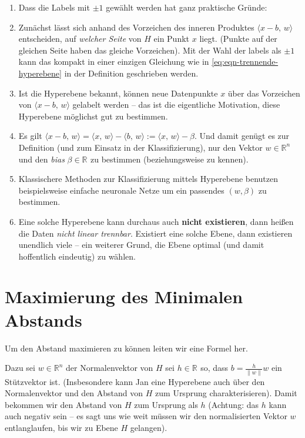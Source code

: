 \documentclass[
]{book}
\providecommand{\tightlist}{%
  \setlength{\itemsep}{0pt}\setlength{\parskip}{0pt}}
\theoremstyle{definition}
\theoremstyle{definition}
\theoremstyle{definition}
\theoremstyle{definition}
\theoremstyle{remark}
\begin{document}
\begin{enumerate}
\def\labelenumi{\arabic{enumi}.}
\tightlist
\item
  Dass die Labels mit \(\pm 1\) gewählt werden hat ganz praktische
  Gründe:
\item
  Zunächst lässt sich anhand des Vorzeichen des inneren Produktes
  \(\bigl \langle x-b, \, w\bigr\rangle \) entscheiden, auf \emph{welcher Seite} von \(H\) ein Punkt \(x\) liegt.
  (Punkte auf der gleichen Seite haben das gleiche Vorzeichen). Mit der Wahl
  der labels als \(\pm 1\) kann das kompakt in einer einzigen Gleichung wie
  in \eqref{eq:eqn-trennende-hyperebene}
  in der Definition geschrieben werden.
\item
  Ist die Hyperebene bekannt, können neue Datenpunkte \(x\) über das
  Vorzeichen von \(\bigl \langle x-b, \, w\bigr\rangle \) gelabelt werden -- das ist die eigentliche
  Motivation, diese Hyperebene möglichst gut zu bestimmen.
\item
  Es gilt \(\bigl \langle x-b, \, w\bigr\rangle =\bigl \langle x, \, w\bigr\rangle -\bigl \langle b, \, w\bigr\rangle :=\bigl \langle x, \, w\bigr\rangle  -\beta\). Und damit
  genügt es zur Definition (und zum Einsatz in der Klassifizierung), nur
  den Vektor \(w\in \mathbb R^{n}\) und den \emph{bias} \(\beta \in \mathbb R^{}\) zu
  bestimmen (beziehungsweise zu kennen).
\item
  Klassischere Methoden zur Klassifizierung mittels Hyperebene benutzen
  beispielsweise einfache neuronale Netze um ein passendes \((w, \beta)\) zu bestimmen.
\item
  Eine solche Hyperebene kann durchaus auch \textbf{nicht existieren}, dann
  heißen die Daten \emph{nicht linear trennbar}. Existiert eine solche Ebene,
  dann existieren unendlich viele -- ein weiterer Grund, die Ebene optimal (und
  damit hoffentlich eindeutig) zu wählen.
\end{enumerate}

\hypertarget{maximierung-des-minimalen-abstands}{%
\section{Maximierung des Minimalen Abstands}\label{maximierung-des-minimalen-abstands}}

Um den Abstand maximieren zu können leiten wir eine Formel her.

Dazu sei \(w\in \mathbb R^{n}\) der Normalenvektor von \(H\) sei \(h\in \mathbb R^{}\)
so, dass \(b=\frac{h}{\|w\|}w\) ein Stützvektor ist. (Insbesondere kann Jan eine
Hyperebene auch über den Normalenvektor und den Abstand von \(H\) zum
Ursprung charakterisieren). Damit bekommen wir den Abstand von \(H\) zum Ursprung
als \(h\) (Achtung: das \(h\) kann auch negativ sein -- es sagt uns wie weit
müssen wir den normalisierten Vektor \(w\) entlanglaufen, bis wir zu Ebene
\(H\) gelangen).
\end{document}
